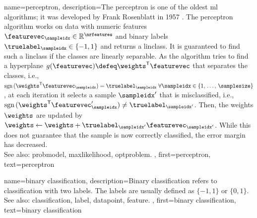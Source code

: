 {name={perceptron}, 
	description={The perceptron is one of the oldest \gls{ml} \glspl{algorithm}; 
		it was developed by Frank Rosenblatt in 1957 \cite{rosenblatt1958perceptron}. 
		The perceptron \gls{algorithm} works on \gls{data} with numeric \glspl{feature} 
		$\featurevec_\sampleidx \in \mathbb{R}^{\nrfeatures}$ 
		and binary \glspl{label} $\truelabel_\sampleidx \in \{-1, 1\}$ and returns a \gls{linclass}. %
		It is guaranteed to find such a \gls{linclass} if the classes are linearly separable. %
		As the \gls{algorithm} tries to find a \gls{hyperplane} $g(\featurevec) \defeq \weights^\mathsf{T} \featurevec$ 
		that separates the classes, i.e., 
		$\text{sgn}\,(\weights^\mathsf{T} \featurevec_\sampleidx) = \truelabel_\sampleidx \; \forall \sampleidx \in \{1, \,\ldots,\, \samplesize \}$, 
		at each \gls{iteration} it selects a \gls{sample} $\sampleidx'$ that is misclassified, i.e., 
		$\text{sgn}\,(\weights^\mathsf{T} \featurevec_{\sampleidx}') \neq \truelabel_{\sampleidx'}$. 
		Then, the \glspl{weight} $\weights$ are updated by 
		$\weights \leftarrow \weights + \truelabel_{\sampleidx'} \featurevec_{\sampleidx'}$. 
		While this does not guarantee that the \gls{sample} is now correctly classified, the error margin has decreased. 
		\\
		See also: \gls{probmodel}, \gls{maxlikelihood}, \gls{optproblem}. },
	first={perceptron},
	text={perceptron}
}

{name={binary classification}, 
	description={Binary \gls{classification} refers to \gls{classification} with two \glspl{label}. 
		The \glspl{label} are usually defined as $\{-1, 1\}$ or $\{0, 1\}$. 
		\\ 
		See also: \gls{classification}, \gls{label}, \gls{datapoint}, \gls{feature}. },
	first={binary classification},
	text={binary classification}
}

